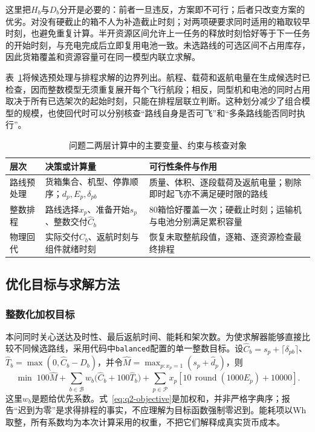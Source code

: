 这里把$H_b$与$D_b$分开是必要的：前者一旦违反，方案即不可行；后者只改变方案的优劣。对没有硬截止的箱不人为补造截止时刻；对两项硬要求同时适用的箱取较早时刻，也避免重复计算。半开资源区间允许上一任务的释放时刻恰好等于下一任务的开始时刻，与充电完成后立即复用电池一致。未选路线的可选区间不占用库存，因此货箱覆盖和资源容量可在同一模型内联立求解。

表~\ref{tab:q2-model-map}将候选预处理与排程求解的边界列出。航程、载荷和返航电量在生成候选时已检查，因而整数模型无须重复展开每个飞行航段；相反，同型机和电池的同时占用取决于所有已选架次的起始时刻，只能在排程层联立判断。这种划分减少了组合模型的规模，也使回代时可以分别核查“路线自身是否可飞”和“多条路线能否同时执行”。
\begin{table}[htbp]
\centering\small
\caption{问题二两层计算中的主要变量、约束与核查对象}
\label{tab:q2-model-map}
\begin{tabular}{@{}p{}p{}p{}@{}}
\toprule
层次 & 决策或计算量 & 可行性条件与作用\\
\midrule
路线预处理 & 货箱集合、机型、停靠顺序；$d_p,E_p,\delta_{pb}$ & 质量、体积、逐段载荷及返航电量；剔除即时起飞亦不满足硬时限的路线\\
整数排程 & 路线选择$x_p$、准备开始$s_p$、整数交付$\widehat C_b$ & 80箱恰好覆盖一次；硬截止时刻；运输机与电池分别满足累积容量\\
物理回代 & 实际交付$C_b$、返航时刻与组件就绪时刻 & 恢复未取整航段值，逐箱、逐资源检查最终排程\\
\bottomrule
\end{tabular}
\end{table}

\subsection{优化目标与求解方法}
\subsubsection{整数化加权目标}
本问同时关心送达及时性、最后返航时间、能耗和架次数。为使求解器能够直接比较不同候选路线，采用代码中\texttt{balanced}配置的单一整数目标。设$\widehat C_b=s_p+\lceil\delta_{pb}\rceil$、$\widehat T_b=\max(0,\widehat C_b-D_b)$，并令$\widehat M=\max_{p:x_p=1}(s_p+\widehat d_p)$，则
\begin{equation}
\min\;100\widehat M
+\sum_{b\in\mathcal B}w_b\bigl(\widehat C_b+100\widehat T_b\bigr)
+\sum_{p\in\mathcal P}x_p\left[10\,\operatorname{round}(1000E_p)+10000\right].
\label{eq:q2-objective}
\end{equation}
这里$w_b$是题给优先系数。式~\eqref{eq:q2-objective}是加权和，并非严格字典序；报告“迟到为零”是求得排程的事实，不应理解为目标函数强制零迟到。能耗项以Wh取整，所有系数均为本次计算采用的权重，不把它们解释成真实货币成本。

